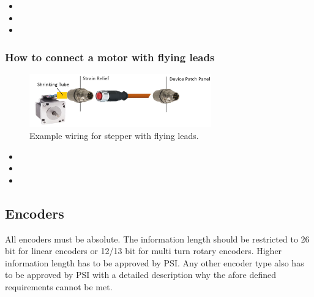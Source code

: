 \begin{itemize}
    \item {}
    \item {}
    \item {}
\end{itemize}

\subsubsection{How to connect a motor with flying leads}
\begin{figure}[H]
\centering
\includegraphics[width=0.7\textwidth]{Figures/StepperFlyingLeads.jpg}
\caption{\label{fig:StepperFlyingLeads}Example wiring for stepper with flying leads.}
\end{figure}

\begin{itemize}
    \item {}
    \item {}
    \item {}
\end{itemize}

\subsection{Encoders}
All encoders must be absolute. The information length should be restricted to 26 bit for linear encoders or 12/13 bit for multi turn rotary encoders. Higher information length has to be approved by PSI. Any other encoder type also has to be approved by PSI with a detailed description why the afore defined requirements cannot be met.

